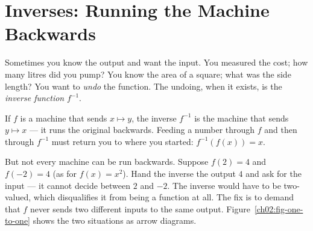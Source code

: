 \section{Inverses: Running the Machine Backwards}
\label{ch02:inverses}
Sometimes you know the output and want the input. You measured the cost; how many
litres did you pump? You know the area of a square; what was the side length? You
want to \emph{undo} the function. The undoing, when it exists, is the
\emph{inverse function} $f^{-1}$.
\begin{intuitionbox}
If $f$ is a machine that sends $x \mapsto y$, the inverse $f^{-1}$ is the machine
that sends $y \mapsto x$ --- it runs the original backwards. Feeding a number
through $f$ and then through $f^{-1}$ must return you to where you started:
$f^{-1}(f(x)) = x$.
\end{intuitionbox}
But not every machine can be run backwards. Suppose $f(2) = 4$ and $f(-2) = 4$
(as for $f(x)=x^2$). Hand the inverse the output $4$ and ask for the input --- it
cannot decide between $2$ and $-2$. The inverse would have to be two-valued, which
disqualifies it from being a function at all. The fix is to demand that $f$ never
sends two different inputs to the same output. Figure~\ref{ch02:fig-one-to-one}
shows the two situations as arrow diagrams.

